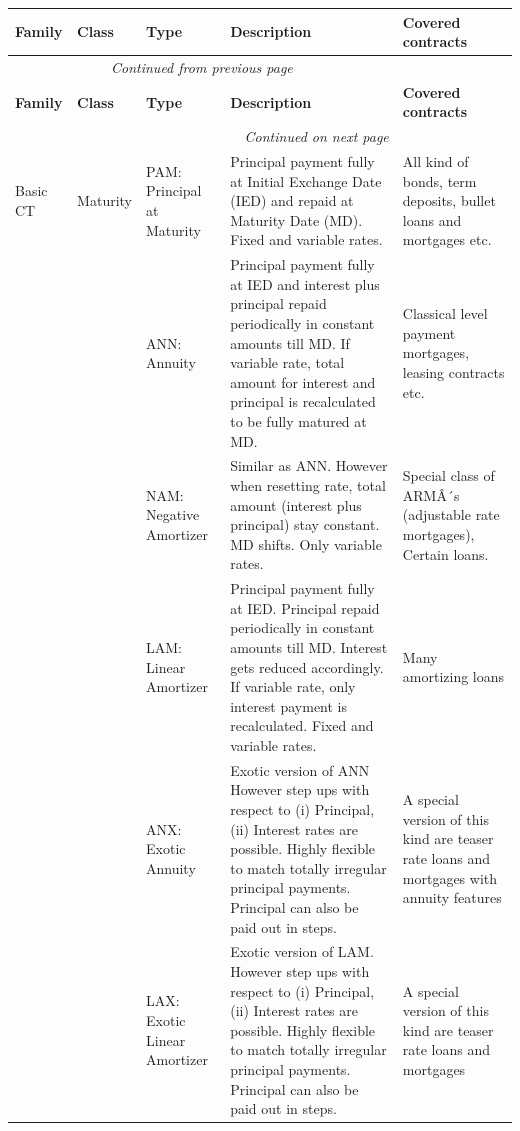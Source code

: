 \documentclass[9pt,oneside]{amsart}
\begin{document}
\begin{longtable}{| p{}p{}p{}p{}p{} |}
	\hline
	\textbf{Family} & \textbf{Class} & \textbf{Type} & \textbf{Description} & \textbf{Covered contracts} \\
	\hline
	\endfirsthead
	\multicolumn{4}{c}{\textit{Continued from previous page}} \\
	\hline
	\textbf{Family} & \textbf{Class} & \textbf{Type} & \textbf{Description} & \textbf{Covered contracts} \\
	\hline
	\endhead
	\hline \multicolumn{4}{r}{\textit{Continued on next page}} \\
	\endfoot
	\hline
	\endlastfoot
	Basic CT & Maturity & PAM: Principal at Maturity & Principal payment fully at Initial Exchange Date (IED) and repaid at Maturity Date (MD). Fixed and variable rates. & All kind of bonds, term deposits, bullet loans and mortgages etc. \\
	\hline
	 & & ANN: Annuity & Principal payment fully at IED and interest plus principal repaid periodically in constant amounts till MD. If variable rate, total amount for interest and principal is recalculated to be fully matured at MD. & Classical level payment mortgages, leasing contracts etc. \\
	\hline 
	 & & NAM: Negative Amortizer & Similar as ANN. However when resetting rate, total amount (interest plus principal) stay constant. MD shifts. Only variable rates. & Special class of ARMÂ´s (adjustable rate mortgages), Certain loans. \\
	\hline 
	 & & LAM: Linear Amortizer & Principal payment fully at IED. Principal repaid periodically in constant amounts till MD. Interest gets reduced accordingly. If variable rate, only interest payment is recalculated. Fixed and variable rates. & Many amortizing loans \\
	\hline 
	 & & ANX: Exotic Annuity & Exotic version of ANN However step ups with respect to (i) Principal, (ii) Interest rates are possible. Highly flexible to match totally irregular principal payments. Principal can also be paid out in steps. & A special version of this kind are teaser rate loans and mortgages with annuity features \\
	\hline 
	 & & LAX: Exotic Linear Amortizer & Exotic version of LAM. However step ups with respect to (i) Principal, (ii) Interest rates are possible. Highly flexible to match totally irregular principal payments. Principal can also be paid out in steps. & A special version of this kind are teaser rate loans and mortgages \\

\end{longtable}
\end{document}
